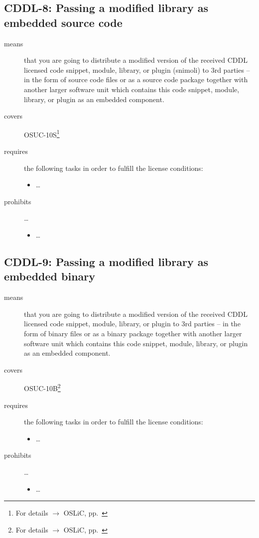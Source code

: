 \subsection{CDDL-8: Passing a modified library as embedded source code}
\label{OSUC-10S-CDDL}

\begin{description}
\item[means] that you are going to distribute a modified version of the received
CDDL licensed code snippet, module, library, or plugin (snimoli) to 3rd parties
-- in the form of source code files or as a source code package together with
another larger software unit which contains this code snippet, module, library,
or plugin as an embedded component.
\item[covers] OSUC-10S\footnote{For details $\rightarrow$ OSLiC, pp.\
\pageref{OSUC-10S-DEF}}
\item[requires] the following tasks in order to fulfill the license conditions:
\begin{itemize}
  
  \item \ldots
  
\end{itemize}

\item[prohibits] \ldots
\begin{itemize}
  \item \ldots
\end{itemize}
\end{description}

\subsection{CDDL-9: Passing a modified library as embedded binary}
\label{OSUC-10B-CDDL}

\begin{description}
\item[means] that you are going to distribute a modified version of the received
CDDL licensed code snippet, module, library, or plugin to 3rd parties -- in the
form of binary files or as a binary package together with another larger
software unit which contains this code snippet, module, library, or plugin as an
embedded component.
\item[covers] OSUC-10B\footnote{For details $\rightarrow$ OSLiC, pp.\
\pageref{OSUC-10B-DEF}}
\item[requires] the following tasks in order to fulfill the license conditions:
\begin{itemize}
  
  \item \ldots
  
\end{itemize}

\item[prohibits] \ldots
\begin{itemize}
  \item \ldots
\end{itemize}
\end{description}

